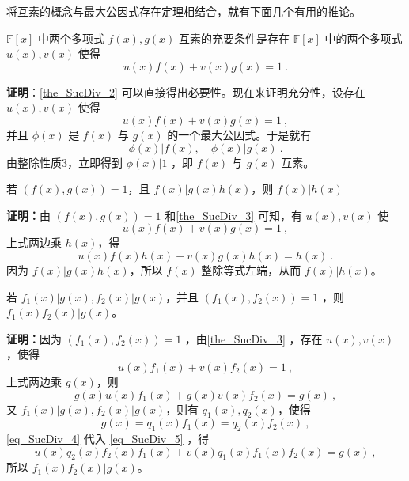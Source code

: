 将互素的概念与最大公因式存在定理相结合，就有下面几个有用的推论。
\begin{theorem}{}\label{the_SucDiv_3}
$\mathbb{F}[x]$ 中两个多项式 $f(x),g(x)$ 互素的充要条件是存在 $\mathbb{F}[x]$ 中的两个多项式 $u(x),v(x)$ 使得
\begin{equation}
u(x)f(x)+v(x)g(x)=1~.
\end{equation}
\end{theorem}
\textbf{证明}：\autoref{the_SucDiv_2} 可以直接得出必要性。现在来证明充分性，设存在 $u(x),v(x)$ 使得 
\begin{equation}
u(x)f(x)+v(x)g(x)=1~,
\end{equation}
并且 $\phi(x)$ 是 $f(x)$ 与 $g(x)$ 的一个最大公因式。于是就有
\begin{equation}
\phi(x)|f(x),\quad \phi(x)|g(x)~.
\end{equation}
由整除性质3，立即得到 $\phi(x)|1$ ，即 $f(x)$ 与 $g(x)$ 互素。
\begin{theorem}{}\label{the_SucDiv_4}
若 $(f(x),g(x))=1$，且 $f(x)|g(x)h(x)$，则 $f(x)|h(x)$
\end{theorem}
\textbf{证明：}由 $(f(x),g(x))=1$ 和\autoref{the_SucDiv_3} 可知，有 $u(x),v(x)$ 使
\begin{equation}
u(x)f(x)+v(x)g(x)=1~,
\end{equation}
上式两边乘 $h(x)$，得
\begin{equation}
u(x)f(x)h(x)+v(x)g(x)h(x)=h(x)~.
\end{equation}
因为 $f(x)|g(x)h(x)$，所以 $f(x)$ 整除等式左端，从而 $f(x)|h(x)$。
\begin{theorem}{}
若 $f_1(x)|g(x),f_2(x)|g(x)$，并且 $(f_1(x),f_2(x))=1$ ，则 $f_1(x)f_2(x)|g(x)$。
\end{theorem}
\textbf{证明：}因为 $(f_1(x),f_2(x))=1$ ，由\autoref{the_SucDiv_3} ，存在 $u(x),v(x)$ ，使得
\begin{equation}
u(x)f_1(x)+v(x)f_2(x)=1~,
\end{equation}
上式两边乘 $g(x)$，则
\begin{equation}\label{eq_SucDiv_5}
g(x)u(x)f_1(x)+g(x)v(x)f_2(x)=g(x)~,
\end{equation}
又 $f_1(x)|g(x),f_2(x)|g(x)$，则有 $q_1(x),q_2(x)$，使得
\begin{equation}\label{eq_SucDiv_4}
g(x)=q_1(x)f_1(x)=q_2(x)f_2(x)~,
\end{equation}
\autoref{eq_SucDiv_4} 代入 \autoref{eq_SucDiv_5} ，得
\begin{equation}
u(x)q_2(x)f_2(x)f_1(x)+v(x)q_1(x)f_1(x)f_2(x)=g(x)~,
\end{equation}
所以 $f_1(x)f_2(x)|g(x)$。